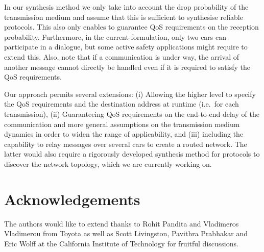 \documentclass{sig-alternate}
\begin{document}
In our synthesis method we only take into account the drop probability of the transmission medium and assume that this is sufficient to synthesise reliable protocols. This also only enables to guarantee QoS requirements on the reception probability. Furthermore, in the current formulation, only two cars can participate in a dialogue, but some active safety applications might require to extend this. Also, note that if a communication is under way, the arrival of another message cannot directly be handled even if it is required to satisfy the QoS requirements.

Our approach permits several extensions: (i) Allowing the higher level to specify the QoS requirements and the destination address at runtime (i.e.\ for each transmission), (ii) Guaranteeing QoS requirements on the end-to-end delay of the communication and more general assumptions on the transmission medium dynamics in order to widen the range of applicability, and (iii) including the capability to relay messages over several cars to create a routed network. The latter would also require a rigorously developed synthesis method for protocols to discover the network topology, which we are currently working on.\\

\vspace{-.06in}

\section*{Acknowledgements} The authors would like to extend thanks to Rohit Pandita and Vladimeros Vladimerou from Toyota as well as Scott Livingston, Pavithra Prabhakar and Eric Wolff at the California Institute of Technology for fruitful discussions.




\small{

}
\end{document}
